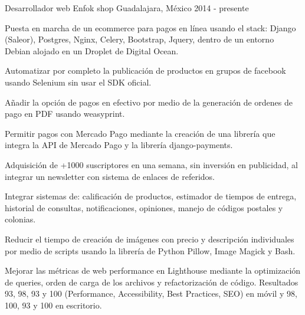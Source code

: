 

\begin{cventries}

  \cventry
    {Desarrollador web}
    {Enfok shop}
    {Guadalajara, México}
    {2014 - presente}
    {
      \begin{cvitems}
        \item {Puesta en marcha de un ecommerce para pagos en línea usando el stack: Django (Saleor), Postgres, Nginx, Celery, Bootstrap, Jquery, dentro de un entorno Debian alojado en un Droplet de Digital Ocean. }
        \item {Automatizar por completo la publicación de productos en grupos de facebook usando Selenium sin usar el SDK oficial. }
        \item {Añadir la opción de pagos en efectivo por medio de la generación de ordenes de pago en PDF usando weasyprint. }
        \item {Permitir pagos con Mercado Pago mediante la creación de una librería que integra la API de Mercado Pago y la librería django-payments. }
        \item {Adquisición de +1000 suscriptores en una semana, sin inversión en publicidad, al integrar un newsletter con sistema de enlaces de referidos. }
        \item {Integrar sistemas de: calificación de productos, estimador de tiempos de entrega, historial de consultas, notificaciones, opiniones, manejo de códigos postales y colonias.}
        \item {Reducir el tiempo de creación de imágenes con precio y descripción individuales por medio de scripts usando la librería de Python Pillow, Image Magick y Bash.}
        \item {Mejorar las métricas de web performance en Lighthouse mediante la optimización de queries, orden de carga de los archivos y refactorización de código. Resultados 93, 98, 93 y 100 (Performance, Accessibility, Best Practices, SEO) en móvil y 98, 100, 93 y 100 en escritorio.}
      \end{cvitems}
    }


\end{cventries}
